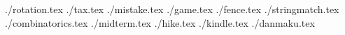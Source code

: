 \documentclass[11pt,letterpaper,oneside]{article}
\newcommand{\importproblem}[2]{{./#2.tex}}
\begin{document}
\raggedbottom

\importproblem{a}{rotation}
\importproblem{b}{tax}
\importproblem{c}{mistake}
\importproblem{d}{game}
\importproblem{e}{fence}
\importproblem{g}{stringmatch}
\importproblem{h}{combinatorics}
\importproblem{i}{midterm}
\importproblem{j}{hike}
\importproblem{k}{kindle}
\importproblem{l}{danmaku}
\end{document}
